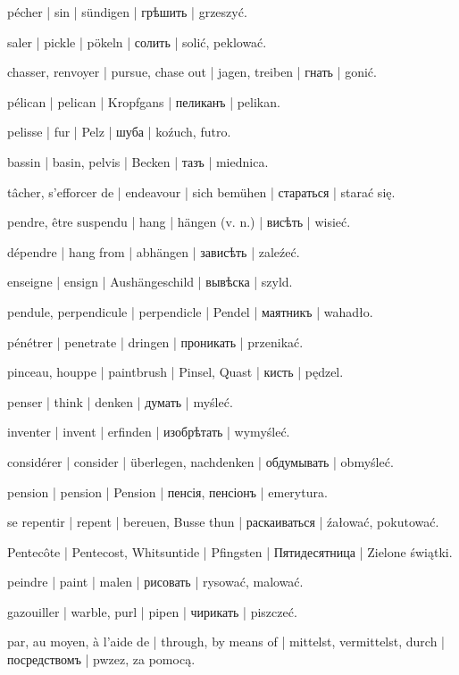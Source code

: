 \begin{outdent}{1em}
pécher | sin | sündigen | грѣшить | grzeszyć.

saler | pickle | pökeln | солить | solić, peklować.

chasser, renvoyer | pursue, chase out | jagen, treiben | гнать | gonić.

pélican | pelican | Kropfgans | пеликанъ | pelikan.

pelisse | fur | Pelz | шуба | koźuch, futro.

bassin | basin, pelvis | Becken | тазъ | miednica.

tâcher, s’efforcer de | endeavour | sich bemühen | стараться | starać się.

pendre, être suspendu | hang | hängen (v. n.) | висѣть | wisieć.

\uvsubentry{}
dépendre | hang from | abhängen | зависѣть | zaleźeć.


\uvsubentry{}
enseigne | ensign | Aushängeschild | вывѣска | szyld.

pendule, perpendicule | perpendicle | Pendel | маятникъ | wahadło.

pénétrer | penetrate | dringen | проникать | przenikać.

pinceau, houppe | paintbrush | Pinsel, Quast | кисть | pędzel.

penser | think | denken | думать | myśleć.

\uvsubentry{}
inventer | invent | erfinden | изобрѣтать | wymyśleć.


\uvsubentry{}
considérer | consider | überlegen, nachdenken | обдумывать | obmyśleć.

pension | pension | Pension | пенсія, пенсіонъ | emerytura.

se repentir | repent | bereuen, Busse thun | раскаиваться | źałować, pokutować.

Pentecôte | Pentecost, Whitsuntide | Pfingsten | Пятидесятница | Zielone świątki.

peindre | paint | malen | рисовать | rysować, malować.

gazouiller | warble, purl | pipen | чирикать | piszczeć.

par, au moyen, à l’aide de | through, by means of | mittelst,
vermittelst, durch | посредствомъ | pwzez, za pomocą.


\end{outdent}
